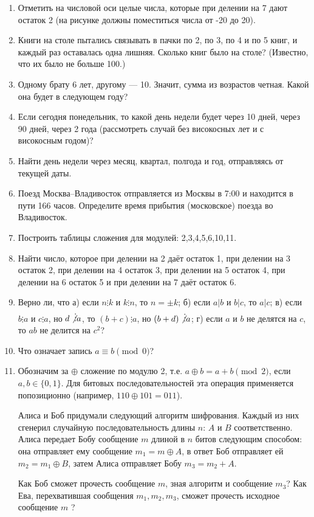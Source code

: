 \begin{enumerate}
\item Отметить на числовой оси целые числа, которые при делении на 7 дают остаток 2 (на рисунке должны поместиться числа от -20 до 20).
\item Книги на столе пытались связывать в пачки по 2, по 3, по 4 и по 5 книг, и каждый раз оставалась одна лишняя. Сколько книг было на столе? (Известно, что их было не больше 100.)
\item Одному брату 6 лет, другому --- 10. Значит, сумма из возрастов четная. Какой она будет в следующем году?
\item Если сегодня понедельник, то какой день недели будет через 10 дней, через 90 дней, через 2 года (рассмотреть случай без високосных лет и с високосным годом)?
\item Найти день недели через месяц, квартал, полгода и год, отправляясь от текущей даты.
\item Поезд Москва--Владивосток отправляется из Москвы в 7:00 и находится в пути 166 часов. Определите время прибытия (московское) поезда во Владивосток.
\item Построить таблицы сложения  для модулей: 2,3,4,5,6,10,11.
\item Найти число, которое при делении на 2 даёт остаток 1, при
делении на 3 остаток 2, при делении на 4 остаток 3, при делении
на 5 остаток 4, при делении на 6 остаток 5 и при делении на 7 даёт
остаток 6.

\item Верно ли, что а) если $n\vdots k$ и $k\vdots n$, то $n=\pm k$; б) если $a|b$ и $b|c$, то $a|c$; в) если $b\vdots a$ и $c\vdots a$, но $d\not\vdots a$, то $(b+c)\vdots a$, но $(b+d)\not\vdots a$; г) если $a$ и $b$ не делятся на $c$, то $ab$ не делится на $c^2$?

\item Что означает запись $a\equiv b\pmod 0$?

\item Обозначим за $\oplus$ сложение по модулю 2, т.е. $a\oplus b = a+b\pmod 2$, если $a,b\in\{0,1\}$. Для битовых последовательностей эта операция применяется попозиционно (например, $110\oplus 101 = 011$).

Алиса и Боб придумали следующий алгоритм шифрования. Каждый из них сгенерил случайную последовательность длины $n$: $A$ и $B$ соответственно. Алиса передает Бобу сообщение $m$ длиной в $n$ битов следующим способом: она отправляет ему сообщение $m_1=m\oplus A$, в ответ Боб отправляет ей $m_2=m_1\oplus B$, затем Алиса отправляет Бобу $m_3=m_2+A$.

Как Боб сможет прочесть сообщение $m$, зная алгоритм и сообщение $m_3$? Как Ева, перехватившая сообщения $m_1,m_2,m_3$, сможет прочесть исходное сообщение $m$ ?

\end{enumerate}




